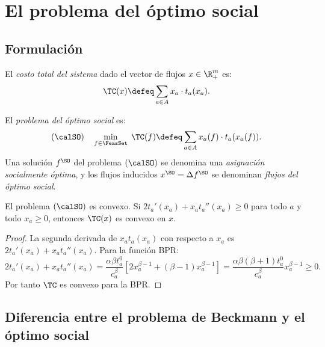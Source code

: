 
\section{El problema del óptimo social}

\subsection{Formulación}


\begin{definition}
El \emph{costo total del sistema} dado el vector de flujos $x \in \R^m_+$ es:
\[
\TC(x) \defeq \sum_{a \in A} x_a \cdot t_a(x_a).
\]
\end{definition}

\begin{definition}\label{def:social_optimum}
El \emph{problema del óptimo social} es:
\begin{equation}\label{eq:social_optimum}
(\calSO) \quad \min_{f \in \FeasSet} \; \TC(f) \defeq \sum_{a \in A} x_a(f) \cdot t_a(x_a(f)).
\end{equation}
Una solución $f^{\SO}$ del problema $(\calSO)$ se denomina una \emph{asignación socialmente óptima}, y los flujos inducidos $x^{\SO} = \Delta f^{\SO}$ se denominan \emph{flujos del óptimo social}.
\end{definition}

\begin{proposition}\label{prop:so_convex}
El problema $(\calSO)$ es convexo. Si $2t_a'(x_a) + x_a t_a''(x_a) \geq 0$ para todo $a$ y todo $x_a \geq 0$, entonces $\TC(x)$ es convexo en $x$.
\end{proposition}

\begin{proof}
La segunda derivada de $x_a t_a(x_a)$ con respecto a $x_a$ es $2t_a'(x_a) + x_a t_a''(x_a)$. Para la función BPR:
\[
2t_a'(x_a) + x_a t_a''(x_a) = \frac{\alpha \beta t_a^0}{c_a^\beta}\left[2 x_a^{\beta-1} + (\beta-1)x_a^{\beta-1}\right] = \frac{\alpha \beta (\beta+1) t_a^0}{c_a^\beta} x_a^{\beta-1} \geq 0.
\]
Por tanto $\TC$ es convexo para la BPR.
\end{proof}

\subsection{Diferencia entre el problema de Beckmann y el óptimo social}

